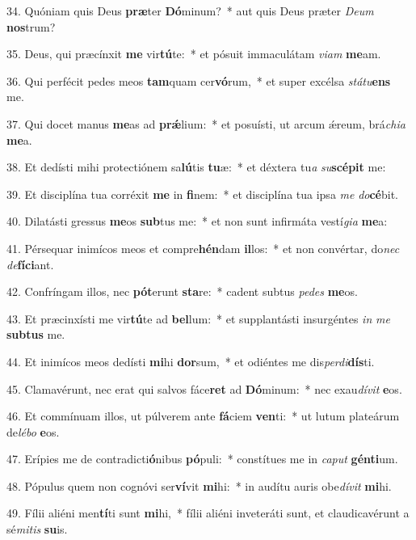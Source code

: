 34. Quóniam quis Deus \textbf{præ}ter \textbf{Dó}minum?~*  aut quis Deus præter \textit{De}\textit{um} \textbf{nos}trum?\

35. Deus, qui præcínxit \textbf{me} vir\textbf{tú}te:~*  et pósuit immaculátam \textit{vi}\textit{am} \textbf{me}am.\

36. Qui perfécit pedes meos \textbf{tam}quam cer\textbf{vó}rum,~*  et super excélsa \textit{stá}\textit{tu}\textbf{ens} me.\

37. Qui docet manus \textbf{me}as ad \textbf{prǽ}lium:~*  et posuísti, ut arcum ǽreum, brá\textit{chi}\textit{a} \textbf{me}a.\

38. Et dedísti mihi protectiónem sa\textbf{lú}tis \textbf{tu}æ:~*  et déxtera tu\textit{a} \textit{su}\textbf{scé}\textbf{pit} me:\

39. Et disciplína tua corréxit \textbf{me} in \textbf{fi}nem:~*  et disciplína tua ipsa \textit{me} \textit{do}\textbf{cé}bit.\

40. Dilatásti gressus \textbf{me}os \textbf{sub}tus me:~*  et non sunt infirmáta vestí\textit{gi}\textit{a} \textbf{me}a:\

41. Pérsequar inimícos meos et compre\textbf{hén}dam \textbf{il}los:~*  et non convértar, do\textit{nec} \textit{de}\textbf{fí}\textbf{ci}ant.\

42. Confríngam illos, nec \textbf{pót}erunt \textbf{sta}re:~*  cadent subtus \textit{pe}\textit{des} \textbf{me}os.\

43. Et præcinxísti me vir\textbf{tú}te ad \textbf{bel}lum:~*  et supplantásti insurgéntes \textit{in} \textit{me} \textbf{sub}\textbf{tus} me.\

44. Et inimícos meos dedísti \textbf{mi}hi \textbf{dor}sum,~*  et odiéntes me dis\textit{per}\textit{di}\textbf{dís}ti.\

45. Clamavérunt, nec erat qui salvos fáce\textbf{ret} ad \textbf{Dó}minum:~*  nec exau\textit{dí}\textit{vit} \textbf{e}os.\

46. Et commínuam illos, ut púlverem ante \textbf{fá}ciem \textbf{ven}ti:~*  ut lutum plateárum de\textit{lé}\textit{bo} \textbf{e}os.\

47. Erípies me de contradicti\textbf{ó}nibus \textbf{pó}puli:~*  constítues me in \textit{ca}\textit{put} \textbf{gén}\textbf{ti}um.\

48. Pópulus quem non cognóvi ser\textbf{ví}vit \textbf{mi}hi:~*  in audítu auris obe\textit{dí}\textit{vit} \textbf{mi}hi.\

49. Fílii aliéni men\textbf{tí}ti sunt \textbf{mi}hi,~*  fílii aliéni inveteráti sunt, et claudicavérunt a sé\textit{mi}\textit{tis} \textbf{su}is.\

